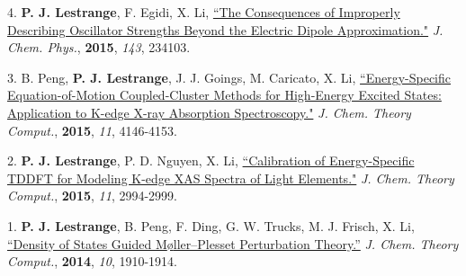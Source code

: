 \begin{cvpublications}

\cvpublication
{4.} 
{\textbf{P. J. Lestrange}, F. Egidi, X. Li, \href{http://scitation.aip.org/content/aip/journal/jcp/143/23/10.1063/1.4937410}{``The Consequences of Improperly Describing Oscillator Strengths Beyond the Electric Dipole Approximation."} \textit{J. Chem. Phys.}, \textbf{2015}, \textit{143}, 234103.} 


\cvpublication
{3.} 
{B. Peng, \textbf{P. J. Lestrange}, J. J. Goings, M. Caricato, X. Li, \href{http://pubs.acs.org/doi/full/10.1021/acs.jctc.5b00459}{``Energy-Specific Equation-of-Motion Coupled-Cluster Methods for High-Energy Excited States: Application to K-edge X-ray Absorption Spectroscopy."} \textit{J. Chem. Theory Comput.}, \textbf{2015}, \textit{11}, 4146-4153.} 


\cvpublication
{2.} 
{\textbf{P. J. Lestrange}, P. D. Nguyen, X. Li, \href{http://pubs.acs.org/doi/abs/10.1021/acs.jctc.5b00169}{``Calibration of Energy-Specific TDDFT for Modeling K-edge XAS Spectra of Light Elements."} \textit{J. Chem. Theory Comput.}, \textbf{2015}, \textit{11}, 2994-2999.} 


\cvpublication
{1.} 
{\textbf{P. J. Lestrange}, B. Peng, F. Ding, G. W. Trucks, M. J. Frisch, X. Li, \href{http://pubs.acs.org/doi/abs/10.1021/ct400765a}{``Density of States Guided M{\o}ller--Plesset Perturbation Theory.''} \textit{J. Chem. Theory Comput.}, \textbf{2014}, \textit{10}, 1910-1914.} 



\end{cvpublications}

